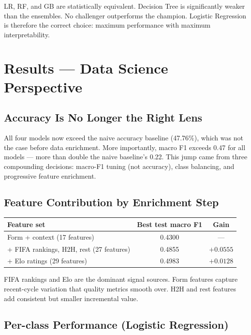 \documentclass[12pt,a4paper,openany]{report}
\begin{document}
\medskip
LR, RF, and GB are statistically equivalent. Decision Tree is significantly
weaker than the ensembles. No challenger outperforms the champion. Logistic
Regression is therefore the correct choice: maximum performance with maximum
interpretability.

\chapter{Results --- Data Science Perspective}

\section{Accuracy Is No Longer the Right Lens}

All four models now exceed the naive accuracy baseline (47.76\%), which was not
the case before data enrichment. More importantly, macro F1 exceeds 0.47 for
all models --- more than double the naive baseline's 0.22. This jump came from
three compounding decisions: macro-F1 tuning (not accuracy), class balancing,
and progressive feature enrichment.

\section{Feature Contribution by Enrichment Step}

\begin{center}
\begin{tabular}{lcc}
  \toprule
  \textbf{Feature set} & \textbf{Best test macro F1} & \textbf{Gain} \\
  \midrule
  Form + context (17 features) & 0.4300 & --- \\
  + FIFA rankings, H2H, rest (27 features) & 0.4855 & $+0.0555$ \\
  + Elo ratings (29 features) & 0.4983 & $+0.0128$ \\
  \bottomrule
\end{tabular}
\end{center}

\medskip
FIFA rankings and Elo are the dominant signal sources. Form features capture
recent-cycle variation that quality metrics smooth over. H2H and rest features
add consistent but smaller incremental value.

\section{Per-class Performance (Logistic Regression)}
\end{document}
